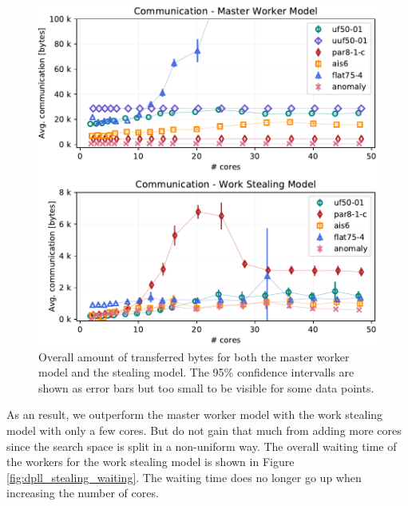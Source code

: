 \documentclass[letterpaper]{article}
\begin{document}
\begin{figure}[p]
    \centering
    \includegraphics[width=\columnwidth]{figures/comm_subset_dpll_scaling_tar.pdf}
    \caption{Overall amount of transferred bytes for both the master worker model and the stealing model.
    The 95\% confidence intervalls are shown as error bars but too small to be visible for some data points.}
    \label{fig:comm_reduce}
\end{figure}

As an result, we outperform the master worker model with the work stealing model with only a few cores.
But do not gain that much from adding more cores since the search space is split in a non-uniform way.
The overall waiting time of the workers for the work stealing model is shown in Figure \ref{fig:dpll_stealing_waiting}.
The waiting time does no longer go up when increasing the number of cores.
\end{document}

